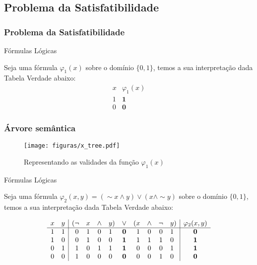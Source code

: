 \documentclass{beamer}
\begin{document}
\subsection{Problema da Satisfatibilidade}

\begin{frame}
\frametitle{Problema da Satisfatibilidade}

\begin{block}{Fórmulas Lógicas}

Seja uma fórmula $\varphi_1 (x)$ sobre  o domínio $\{0 , 1\}$,
temos a sua interpretação dada Tabela Verdade abaixo:
$$
\begin{array}{c|c}
x & \varphi_1 (x)\\\hline
1 & \mathbf{1}\\
0 & \mathbf{0}
\end{array}
$$
\end{block}

\end{frame}


\begin{frame}
\frametitle{Árvore semântica}
\begin{figure}[ht!]
 \centering
 \texttt{[image: figuras/x\_tree.pdf]}
\caption{Representando as validades da função $\varphi_1 (x)$} 
\end{figure}

\end{frame}


\begin{frame}
\begin{block}{Fórmulas Lógicas}


Seja uma fórmula $\varphi_2 (x,y) = (\sim x \wedge y)\vee (x \wedge \sim y)$ 
sobre  o domínio $\{0 , 1\}$,
temos a sua interpretação dada Tabela Verdade abaixo:

$$
\begin{array}{cc|c@{}cccc@{}ccc@{}cccc@{}c | c}
x & y & ( &\lnot&x&\land&y&)&\lor&(&x&\land&\lnot&y&) & \varphi_2 (x,y) \\ \hline
1&1&&0&1&0&1&&\mathbf{0}&&1&0&0&1& & \mathbf{0}  \\
1&0&&0&1&0&0&&\mathbf{1}&&1&1&1&0& & \mathbf{1} \\
0&1&&1&0&1&1&&\mathbf{1}&&0&0&0&1& & \mathbf{1} \\
0&0&&1&0&0&0&&\mathbf{0}&&0&0&1&0& & \mathbf{0}
\end{array}
$$

\end{block}

\end{frame}
\end{document}
